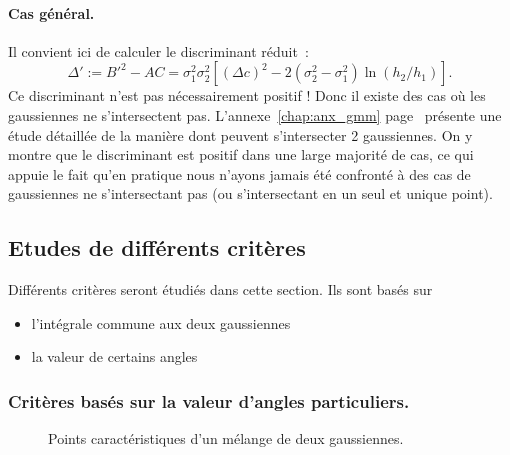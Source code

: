 \documentclass[main.tex]{subfiles}
\begin{document}
\paragraph{Cas général.} Il convient ici de calculer le discriminant réduit~:
\begin{equation}
\label{eq:discr_reduit}
\Delta' := B'^2 - AC = \sigma_1^2 \sigma_2^2 \left[ (\Delta c)^2 - 2(\sigma_2^2-\sigma_1^2) \ln (h_2/h_1)  \right].
\end{equation}
Ce discriminant n'est pas nécessairement positif ! Donc il existe des cas où les gaussiennes ne s'intersectent pas. L'annexe~\ref{chap:anx_gmm} page~\pageref{chap:anx_gmm} présente une étude détaillée de la manière dont peuvent s'intersecter 2 gaussiennes. On y montre que le discriminant est positif dans une large majorité de cas, ce qui appuie le fait qu'en pratique nous n'ayons jamais été confronté à des cas de gaussiennes ne s'intersectant pas (ou s'intersectant en un seul et unique point).

\subsection{Etudes de différents critères}
Différents critères seront étudiés dans cette section. Ils sont basés sur
\begin{itemize}
\item l'intégrale commune aux deux gaussiennes
\item la valeur de certains angles
\end{itemize}

\subsubsection{Critères basés sur la valeur d'angles particuliers.}
\begin{figure}
\qquad
{}
\caption{\label{fig:pts_carac_intersection_gaussienne}Points caractéristiques d'un mélange de deux gaussiennes.}
\end{figure}
\end{document}
